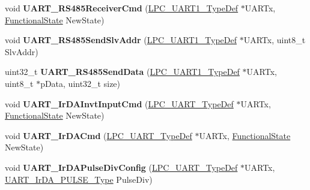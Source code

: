 \begin{DoxyCompactItemize}
\item 
\hypertarget{group___u_a_r_t___public___functions_ga8c43ccaa9104baab28df1b0afe57a195}{void {\bfseries \-U\-A\-R\-T\-\_\-\-R\-S485\-Receiver\-Cmd} (\hyperlink{struct_l_p_c___u_a_r_t1___type_def}{\-L\-P\-C\-\_\-\-U\-A\-R\-T1\-\_\-\-Type\-Def} $\ast$\-U\-A\-R\-Tx, \hyperlink{group___l_p_c___types___public___types_gac9a7e9a35d2513ec15c3b537aaa4fba1}{\-Functional\-State} \-New\-State)}\label{group___u_a_r_t___public___functions_ga8c43ccaa9104baab28df1b0afe57a195}

\item 
\hypertarget{group___u_a_r_t___public___functions_ga51d8e73f086bb57478966b6b699404d8}{void {\bfseries \-U\-A\-R\-T\-\_\-\-R\-S485\-Send\-Slv\-Addr} (\hyperlink{struct_l_p_c___u_a_r_t1___type_def}{\-L\-P\-C\-\_\-\-U\-A\-R\-T1\-\_\-\-Type\-Def} $\ast$\-U\-A\-R\-Tx, uint8\-\_\-t \-Slv\-Addr)}\label{group___u_a_r_t___public___functions_ga51d8e73f086bb57478966b6b699404d8}

\item 
\hypertarget{group___u_a_r_t___public___functions_ga97fc6a99efa2983668cf2d18c5ff7536}{uint32\-\_\-t {\bfseries \-U\-A\-R\-T\-\_\-\-R\-S485\-Send\-Data} (\hyperlink{struct_l_p_c___u_a_r_t1___type_def}{\-L\-P\-C\-\_\-\-U\-A\-R\-T1\-\_\-\-Type\-Def} $\ast$\-U\-A\-R\-Tx, uint8\-\_\-t $\ast$p\-Data, uint32\-\_\-t size)}\label{group___u_a_r_t___public___functions_ga97fc6a99efa2983668cf2d18c5ff7536}

\item 
\hypertarget{group___u_a_r_t___public___functions_gaf124bd5ad22ea3060cbb388f76fdb3d7}{void {\bfseries \-U\-A\-R\-T\-\_\-\-Ir\-D\-A\-Invt\-Input\-Cmd} (\hyperlink{struct_l_p_c___u_a_r_t___type_def}{\-L\-P\-C\-\_\-\-U\-A\-R\-T\-\_\-\-Type\-Def} $\ast$\-U\-A\-R\-Tx, \hyperlink{group___l_p_c___types___public___types_gac9a7e9a35d2513ec15c3b537aaa4fba1}{\-Functional\-State} \-New\-State)}\label{group___u_a_r_t___public___functions_gaf124bd5ad22ea3060cbb388f76fdb3d7}

\item 
\hypertarget{group___u_a_r_t___public___functions_ga4c946a4ac4dd32ea5644f78cebaccc85}{void {\bfseries \-U\-A\-R\-T\-\_\-\-Ir\-D\-A\-Cmd} (\hyperlink{struct_l_p_c___u_a_r_t___type_def}{\-L\-P\-C\-\_\-\-U\-A\-R\-T\-\_\-\-Type\-Def} $\ast$\-U\-A\-R\-Tx, \hyperlink{group___l_p_c___types___public___types_gac9a7e9a35d2513ec15c3b537aaa4fba1}{\-Functional\-State} \-New\-State)}\label{group___u_a_r_t___public___functions_ga4c946a4ac4dd32ea5644f78cebaccc85}

\item 
\hypertarget{group___u_a_r_t___public___functions_ga066c5b2f961d138fd388be4edff883ad}{void {\bfseries \-U\-A\-R\-T\-\_\-\-Ir\-D\-A\-Pulse\-Div\-Config} (\hyperlink{struct_l_p_c___u_a_r_t___type_def}{\-L\-P\-C\-\_\-\-U\-A\-R\-T\-\_\-\-Type\-Def} $\ast$\-U\-A\-R\-Tx, \hyperlink{group___u_a_r_t___public___types_ga2e41fe7d668367ce455940f7dfde1d92}{\-U\-A\-R\-T\-\_\-\-Ir\-D\-A\-\_\-\-P\-U\-L\-S\-E\-\_\-\-Type} \-Pulse\-Div)}\label{group___u_a_r_t___public___functions_ga066c5b2f961d138fd388be4edff883ad}

\end{DoxyCompactItemize}
